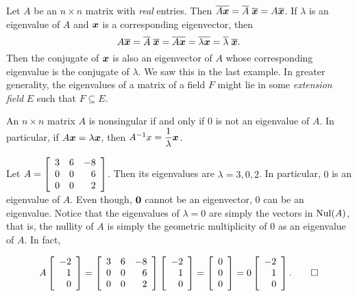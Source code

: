Let $A$ be an $n\times n$ matrix with \emph{real} entries. Then $\overline{A\bb x} = \overline{A}\;\overline{\bb x} = A\overline{\bb x}$. If $\lambda$ is an eigenvalue of $A$ and $\bb x$ is a corresponding eigenvector, then 
\[A\overline{\bb x} = \overline{A}\;\overline{\bb x} =\overline{A\bb x} = \overline{\lambda \bb x} = \overline{\lambda}\;\overline{\bb x}.\] Then the conjugate of $\bb x$ is also an eigenvector of $A$ whose corresponding eigenvalue is the conjugate of $\lambda$. We saw this in the last example. In greater generality, the eigenvalues of a matrix of a field $F$ might lie in some \emph{extension field} $E$ such that $F\subseteq E$.\\

\begin{Thm} An $n\times n$ matrix $A$ is nonsingular if and only if $0$ is not an eigenvalue of $A$. In particular,  if $A\bb x = \lambda \bb x$, then $A^{-1}x = \dfrac{1}{\lambda}\bb x$.
\end{Thm}
%

\begin{Exam} Let $A = \mtx{rrr}{3&6&-8\\0&0&6\\0&0&2}$. Then its eigenvalues are $\lambda = 3, 0, 2$. In particular, $0$ is an eigenvalue of $A$. Even though, $\bb 0$ cannot be an eigenvector, $0$ can be an eigenvalue. Notice that the eigenvalues of $\lambda =0$ are simply the vectors in $\nul(A)$, that is, the nullity of $A$ is simply the geometric multiplicity of $0$ as an eigenvalue of $A$. In fact, 

\[A\vr{-2\\1\\0} = \mtx{rrr}{3&6&-8\\0&0&6\\0&0&2}\vr{-2\\1\\0} = \vr{0\\0\\0} = 0\vr{-2\\1\\0}. \qedhere\] 
\end{Exam}


